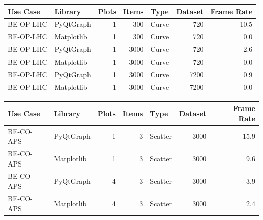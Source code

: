 
\begin{table}[h]
\begin{center}

\label{tab:application:usecases:results:lhc}

\begin{tabular}{llrrlrr}

\hline
Use Case  & Library    & Plots & Items & Type    & Dataset & Frame Rate  \\
\hline
BE-OP-LHC & PyQtGraph  & 1     & 300   & Curve   & 720     & 10.5        \\
BE-OP-LHC & Matplotlib & 1     & 300   & Curve   & 720     & 0.0         \\
BE-OP-LHC & PyQtGraph  & 1     & 3000  & Curve   & 720     & 2.6         \\
BE-OP-LHC & Matplotlib & 1     & 3000  & Curve   & 720     & 0.0         \\
BE-OP-LHC & PyQtGraph  & 1     & 3000  & Curve   & 7200    & 0.9         \\
BE-OP-LHC & Matplotlib & 1     & 3000  & Curve   & 7200    & 0.0         \\
\hline

\end{tabular}
\end{center}
\end{table}


\begin{table}[h]
\begin{center}

\label{tab:application:usecases:results:aps}

\begin{tabular}{llrrlrr}

\hline
Use Case  & Library    & Plots & Items & Type    & Dataset & Frame Rate  \\
\hline
BE-CO-APS & PyQtGraph  & 1     & 3     & Scatter & 3000    & 15.9        \\
BE-CO-APS & Matplotlib & 1     & 3     & Scatter & 3000    & 9.6         \\
BE-CO-APS & PyQtGraph  & 4     & 3     & Scatter & 3000    & 3.9         \\
BE-CO-APS & Matplotlib & 4     & 3     & Scatter & 3000    & 2.4         \\
\hline

\end{tabular}
\end{center}
\end{table}

